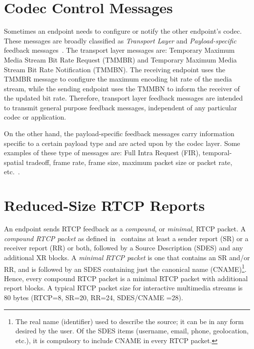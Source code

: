 

\section{Codec Control Messages}

Sometimes an endpoint needs to configure or notify the other endpoint's codec.
These messages are broadly classified as \emph{Transport Layer} and \emph
{Payload-specific} feedback messages~\cite{rfc4585, rfc5104}. The transport
layer messages are: Temporary Maximum Media Stream Bit Rate Request (TMMBR)
and Temporary Maximum Media Stream Bit Rate Notification (TMMBN). The
receiving endpoint uses the TMMBR message to configure the maximum encoding
bit rate of the media stream, while the sending endpoint uses the TMMBN to
inform the receiver of the updated bit rate. Therefore, transport layer
feedback messages are intended to transmit general purpose feedback messages,
independent of any particular codec or application.

On the other hand, the payload-specific feedback messages carry information
specific to a certain payload type and are acted upon by the codec layer. Some
examples of these type of messages are: Full Intra Request (FIR), 
temporal-spatial tradeoff, frame rate, frame size, maximum packet size or packet rate,
etc.~\cite{draft.avt.cop}.

\section{Reduced-Size RTCP Reports}

An endpoint sends RTCP feedback as a \emph{compound}, or \emph{minimal}, RTCP
packet. A \emph{compound RTCP packet} as defined in~\cite{rfc3585} contains
at least a sender report (SR) or a receiver report (RR) or both, followed by
a Source Description (SDES) and any additional XR blocks. A \emph{minimal RTCP
packet} is one that contains an SR and/or RR, and is followed by an SDES
containing just the canonical name (CNAME)\footnote{The real name
(identifier) used to describe the source; it can be in any form desired by the
user. Of the SDES items (username, email, phone, geolocation, etc.), it is 
compulsory to include CNAME in every RTCP packet.}. Hence, every compound RTCP
packet is a minimal RTCP packet with additional report blocks. A typical RTCP
packet size for interactive multimedia streams is 80 bytes (RTCP=8, SR=20,
RR=24, SDES/CNAME =28).

